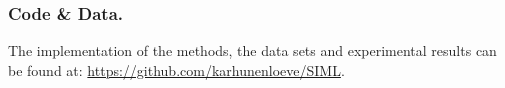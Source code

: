\documentclass[runningheads]{llncs}
\begin{document}
\subsubsection*{Code \& Data.} The implementation of the methods, the data sets and experimental results can be found at: \url{https://github.com/karhunenloeve/SIML}.
%
%


\end{document}
